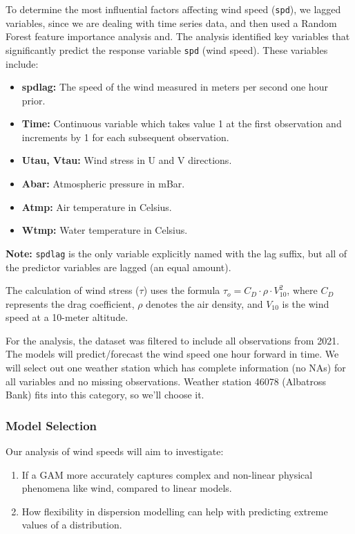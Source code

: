 \documentclass[12pt, twoside,hidelinks]{article}
\theoremstyle{definition}
\numberwithin{equation}{section}
\begin{document}
To determine the most influential factors affecting wind speed (\texttt{spd}), we lagged variables, since we are dealing with time series data, and then used a Random Forest feature importance analysis and. The analysis identified key variables that significantly predict the response variable \texttt{spd} (wind speed). These variables include:

\begin{itemize}
    \item \textbf{spdlag:} The speed of the wind measured in meters per second one hour prior.
    \item \textbf{Time:} Continuous variable which takes value 1 at the first observation and increments by 1 for each subsequent observation.
    \item \textbf{Utau, Vtau:} Wind stress in U and V directions.
    \item \textbf{Abar:} Atmospheric pressure in mBar.
    \item \textbf{Atmp:} Air temperature in Celsius.
    \item \textbf{Wtmp:} Water temperature in Celsius.
\end{itemize}

\textbf{Note:} \texttt{spdlag} is the only variable explicitly named with the lag suffix, but all of the predictor variables are lagged (an equal amount). 

The calculation of wind stress (\(\tau\)) uses the formula \(\tau_o = C_D \cdot \rho \cdot V_{10}^2\), where \(C_D\) represents the drag coefficient, \(\rho\) denotes the air density, and \(V_{10}\) is the wind speed at a 10-meter altitude.
\newline

For the analysis, the dataset was filtered to include all observations from 2021. The models will predict/forecast the wind speed one hour forward in time. We will select out one weather station which has complete information (no NAs) for all variables and no missing observations. Weather station 46078 (Albatross Bank) fits into this category, so we'll choose it.

\subsubsection{Model Selection}

Our analysis of wind speeds will aim to investigate:

\begin{enumerate}
    \item If a GAM more accurately captures complex and non-linear physical phenomena like wind, compared to linear models. \\
    \item How flexibility in dispersion modelling can help with predicting extreme values of a distribution.
\end{enumerate}
\end{document}
